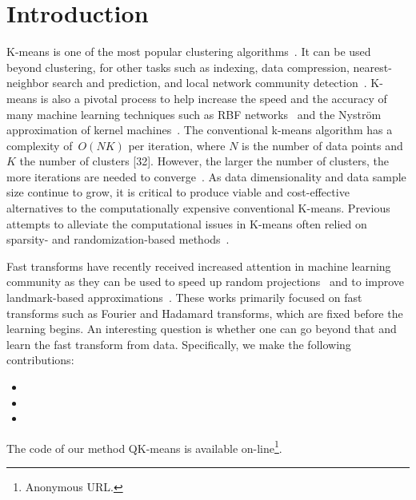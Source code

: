 \section{Introduction}


K-means is one of the most popular clustering algorithms~\cite{hartigan1979algorithm,jain2010data}. It can be used beyond clustering, for other tasks such as indexing, data compression,  nearest-neighbor search and prediction, and local network community detection~\cite{muja2014scalable,van2016local}. K-means is also a pivotal process to help increase the speed and the accuracy of many machine learning techniques such as RBF networks~\cite{que2016back} and the Nyström approximation of kernel machines~\cite{si2016computationally}.
%
The  conventional  k-means  algorithm  has  a  complexity  of~$O(NK)$ per iteration, where $N$ is the number of data points and $K$ the number of clusters [32]. However, the larger the number of clusters, the more iterations are needed to converge~\cite{arthur2006slow}.
%
As data dimensionality and data sample size continue to grow, it is critical to produce viable and cost-effective alternatives to the computationally expensive conventional K-means. Previous attempts to alleviate the computational issues in K-means often relied on sparsity- and randomization-based methods~\cite{boutsidis2014randomized,shen2017compressed,liu2017sparse}.

Fast transforms have recently received increased attention in machine learning community as they can be used  to speed up random projections~\cite{le2013fastfood,gittens2016revisiting} and to improve landmark-based approximations~\cite{si2016computationally}.
%
These works primarily focused on fast transforms such as Fourier and Hadamard transforms, which are fixed before the learning begins. An interesting question is whether one can go beyond that and learn the fast transform from data. 
%
Specifically, we make the following contributions:
\begin{itemize}
	\item {}
	\item {}
	\item {}
\end{itemize}

The code of our method QK-means is available on-line\footnote{Anonymous URL.}.




